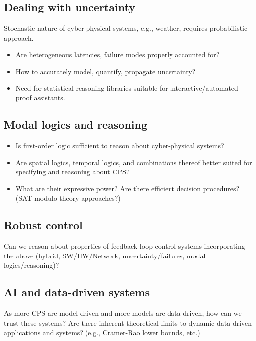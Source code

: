 \documentclass[
graybox,
envcountchap
]{svmult}
\begin{document}
\begin{bibunit}
    \subsection{Dealing with uncertainty}

    Stochastic nature of cyber-physical systems, e.g., weather, requires probabilistic approach.
    
    \begin{itemize}
    \item Are heterogeneous latencies, failure modes properly accounted for?
    \item How to accurately model, quantify, propagate uncertainty?
    \item Need for statistical reasoning libraries suitable for interactive/automated proof assistants.
    \end{itemize}

    \subsection{Modal logics and reasoning}
    
    \begin{itemize}
    \item  Is first-order logic sufficient to reason about cyber-physical systems?
    \item Are spatial logics, temporal logics, and combinations thereof better suited for specifying and reasoning about CPS?
    \item What are their expressive power?   Are there efficient decision procedures?  (SAT modulo theory approaches?)
    \end{itemize}

    \subsection{Robust control}

    Can we reason about properties of feedback loop control systems incorporating the above (hybrid, SW/HW/Network, uncertainty/failures, modal logics/reasoning)?
    
    \subsection{AI and data-driven systems}

    As more CPS are model-driven and more models are data-driven, how can we trust these systems?  Are there inherent theoretical limits to dynamic data-driven applications and systems? (e.g., Cramer-Rao lower bounds, etc.)


\end{bibunit}
\end{document}
